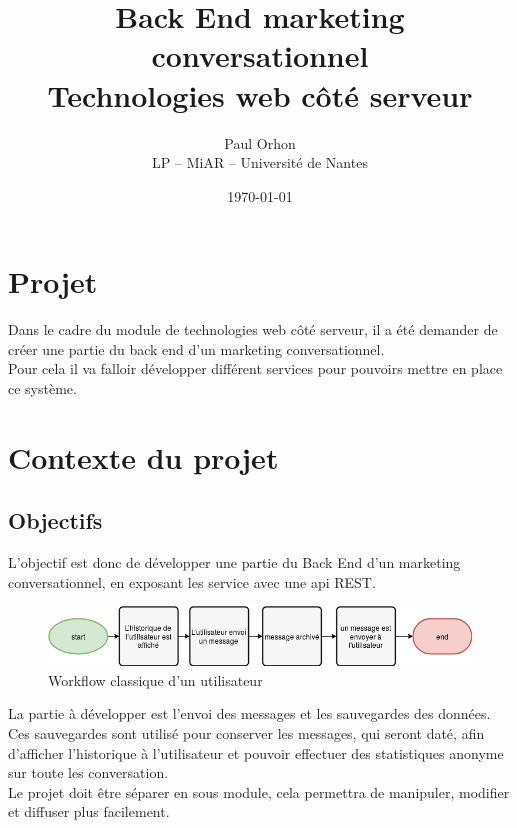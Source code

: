 \documentclass[12pt]{article}
\title{Back End marketing conversationnel\\
    \normalsize Technologies web côté serveur}
\date{\today}
\author{Paul Orhon\\
\small LP -- MiAR -- Université de Nantes }
\begin{document}
\maketitle%
\tableofcontents

\listoffigures


\clearpage

\section{Projet}
Dans le cadre du module de technologies web côté serveur, il a été demander de créer une partie du back end d’un marketing conversationnel.
\\

Pour cela il va falloir développer différent services pour pouvoirs mettre en place ce système.



\section{Contexte du projet}
\subsection{Objectifs}
L'objectif est donc de développer une partie du Back End d’un marketing conversationnel, en exposant les service avec une api REST.
\\

\begin{figure}[h]
    \centering
    \includegraphics[width=\linewidth]{img/workflow_user.png}
    \caption{Workflow classique d'un utilisateur}
\end{figure}

La partie à développer est l'envoi des messages et les sauvegardes des données. Ces sauvegardes sont utilisé pour conserver les messages, qui seront daté, afin d'afficher l'historique à l'utilisateur et pouvoir effectuer des statistiques anonyme sur toute les conversation.
\\

Le projet doit être séparer en sous module, cela permettra de manipuler, modifier et diffuser plus facilement.
\end{document}

